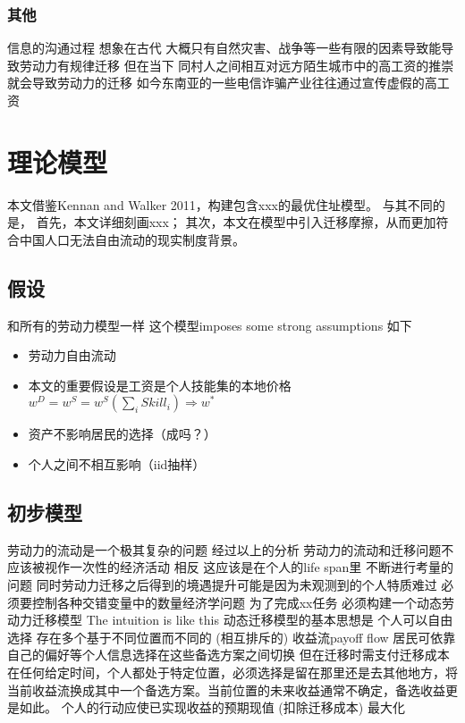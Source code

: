 \documentclass{article}
\numberwithin{equation}{section} %
\begin{document}
\subsubsection{其他}

信息的沟通过程
想象在古代 大概只有自然灾害、战争等一些有限的因素导致能导致劳动力有规律迁移
但在当下 同村人之间相互对远方陌生城市中的高工资的推崇就会导致劳动力的迁移
如今东南亚的一些电信诈骗产业往往通过宣传虚假的高工资



\section{理论模型}
本文借鉴Kennan and Walker 2011，构建包含xxx的最优住址模型。
与其不同的是，
首先，本文详细刻画xxx；
其次，本文在模型中引入迁移摩擦，从而更加符合中国人口无法自由流动的现实制度背景。

\subsection{假设}
和所有的劳动力模型一样 这个模型imposes some strong assumptions
如下
\begin{itemize}
\item 劳动力自由流动
\item 本文的重要假设是工资是个人技能集的本地价格$w^{D}=w^{S}=w^{S}(\sum\limits_{i}Skill_{i})\Rightarrow w^*$
\item 资产不影响居民的选择（成吗？）
\item 个人之间不相互影响（iid抽样）
\end{itemize}


\subsection{初步模型}
劳动力的流动是一个极其复杂的问题
经过以上的分析
劳动力的流动和迁移问题不应该被视作一次性的经济活动
相反
这应该是在个人的life span里
不断进行考量的问题
同时劳动力迁移之后得到的境遇提升可能是因为未观测到的个人特质难过
必须要控制各种交错变量中的数量经济学问题
为了完成xx任务
必须构建一个动态劳动力迁移模型
The intuition is like this
动态迁移模型的基本思想是
个人可以自由选择
存在多个基于不同位置而不同的 (相互排斥的) 收益流payoff flow 
居民可依靠自己的偏好等个人信息选择在这些备选方案之间切换
但在迁移时需支付迁移成本
在任何给定时间，个人都处于特定位置，必须选择是留在那里还是去其他地方，将当前收益流换成其中一个备选方案。当前位置的未来收益通常不确定，备选收益更是如此。
个人的行动应使已实现收益的预期现值 (扣除迁移成本) 最大化
\end{document}
